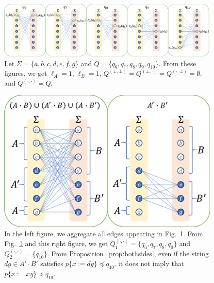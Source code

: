 \begin{figure}[t]
  \begin{center}
    \includegraphics[scale=0.8]{figs/lem8eachreg-suppl.png}
    \caption{Let $\Sigma=\{a,b,c,d,e,f,g\}$ {\color{red} and} $Q=\{q_6,q_7,q_8,q_9,q_{10}\}$. From these figures, we get $\ell_A=1$, $\ell_B=1$, $Q^{(\bot,\bot)}=Q^{(\bot,\cdot)}=Q^{(\cdot,\bot)}=\emptyset$, and $Q^{(\cdot,\cdot)}=Q$.}\label{fig:lem8eachreg-suppl}
  \end{center}
\end{figure}

\begin{figure}[t]
  \begin{center}
    \includegraphics[scale=0.8]{figs/lem8totalreg-suppl.png}
    \caption{In the left figure, we aggregate all edges appearing in Fig.~\ref{fig:lem8eachreg-suppl}. From Fig.~\ref{fig:lem8eachreg-suppl} and this right figure, we get $Q_{1}^{(\cdot,\cdot)}=\{q_6,q_7,q_8,q_9\}$ and $Q_{2}^{(\cdot,\cdot)}=\{q_{10}\}$. From Proposition~\ref{prop:bothsides}, even if the string $dg \in A'\cdot B'$ satisfies {\color{red}$p \{ x:=dg \} \preceq q_{10}$}, it does not imply that $p \{ x:=xy \} \preceq q_{10}$.}\label{fig:lem8totalreg-suppl}
  \end{center}
\end{figure}

